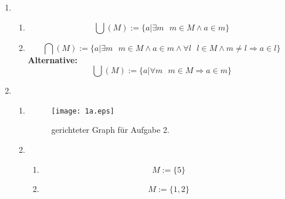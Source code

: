 \documentclass[a4paper]{article}
\begin{document}
	\begin{enumerate}
		\item
		\begin{enumerate}
			\item
			\begin{equation*}
				\bigcup(M) := \{ a | \exists m \text{ } m \in M \land a \in m \}
			\end{equation*}
			
			\item
			\begin{equation*}
				\bigcap(M) := \{ a | \exists m \text{ } m \in M \land a \in m \land \forall l \text{ } l \in M \land m \neq l  \Rightarrow a \in l \}
			\end{equation*}
			\textbf{Alternative: }
			\begin{equation*}
				\bigcup(M) := \{ a | \forall m \text{ } m \in M \Rightarrow a \in m \}
			\end{equation*}
		\end{enumerate}
		
		\item
		\begin{enumerate}
			\item
			\begin{figure}[ht!]
				\begin{center}
					\texttt{[image: 1a.eps]}
					\caption{gerichteter Graph für Aufgabe 2.}
				\end{center}
			\end{figure}
			
			\item
			\begin{enumerate}
				\item
				\begin{equation*}
					M := \{ 5 \}
				\end{equation*}
				
				\item
				\begin{equation*}
					M := \{ 1, 2 \}
				\end{equation*}
			\end{enumerate}
			

\end{enumerate}
\end{enumerate}
\end{document}
